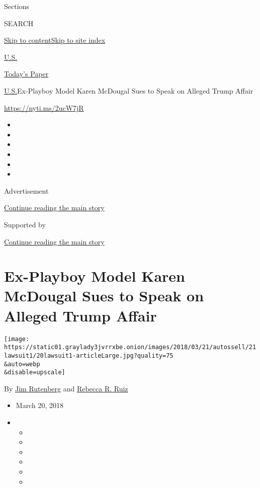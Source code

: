 Sections

SEARCH

\protect\hyperlink{site-content}{Skip to
content}\protect\hyperlink{site-index}{Skip to site index}

\href{https://www.nytimes3xbfgragh.onion/section/us}{U.S.}

\href{https://myaccount.nytimes3xbfgragh.onion/auth/login?response_type=cookie\&client_id=vi}{}

\href{https://www.nytimes3xbfgragh.onion/section/todayspaper}{Today's
Paper}

\href{/section/us}{U.S.}\textbar{}Ex-Playboy Model Karen McDougal Sues
to Speak on Alleged Trump Affair

\url{https://nyti.ms/2ucW7jR}

\begin{itemize}
\item
\item
\item
\item
\item
\item
\end{itemize}

Advertisement

\protect\hyperlink{after-top}{Continue reading the main story}

Supported by

\protect\hyperlink{after-sponsor}{Continue reading the main story}

\hypertarget{ex-playboy-model-karen-mcdougal-sues-to-speak-on-alleged-trump-affair}{%
\section{Ex-Playboy Model Karen McDougal Sues to Speak on Alleged Trump
Affair}\label{ex-playboy-model-karen-mcdougal-sues-to-speak-on-alleged-trump-affair}}

\texttt{[image: https://static01.graylady3jvrrxbe.onion/images/2018/03/21/autossell/21lawsuit1/20lawsuit1-articleLarge.jpg?quality=75\\\&auto=webp\\\&disable=upscale]}

By \href{https://www.nytimes3xbfgragh.onion/by/jim-rutenberg}{Jim
Rutenberg} and
\href{https://www.nytimes3xbfgragh.onion/by/rebecca-r-ruiz}{Rebecca R.
Ruiz}

\begin{itemize}
\item
  March 20, 2018
\item
  \begin{itemize}
  \item
  \item
  \item
  \item
  \item
  \item
  \end{itemize}
\end{itemize}

